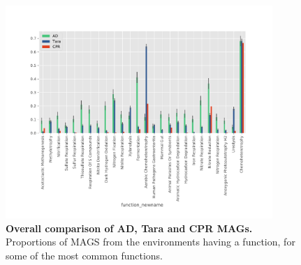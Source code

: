 \documentclass[10pt,letterpaper]{article}
\begin{document}
\begin{figure}
\includegraphics[width=0.9\textwidth]{mag_comparison_bars_cpr}
\caption{{\bf Overall comparison of AD, Tara and CPR MAGs.}
Proportions of MAGS from the environments having a function, for some of the most common functions.}
\label{mag-compare}
\end{figure}



\nolinenumbers

%
%
% 

\clearpage

{}





\end{document}
